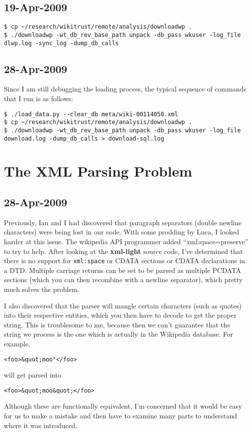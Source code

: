 \subsection{19-Apr-2009}

\begin{verbatim}
$ cp ~/research/wikitrust/remote/analysis/downloadwp .
$ ./downloadwp -wt_db_rev_base_path unpack -db_pass wkuser -log_file dlwp.log -sync_log -dump_db_calls
\end{verbatim}

\subsection{28-Apr-2009}

Since I am still debugging the loading process, the typical sequence
of commands that I run is as follows:
\begin{verbatim}
$ ./load_data.py --clear_db meta/wiki-00114050.xml
$ cp ~/research/wikitrust/remote/analysis/downloadwp .
$ ./downloadwp -wt_db_rev_base_path unpack -db_pass wkuser -log_file download.log -dump_db_calls > download-sql.log
\end{verbatim}

\section{The XML Parsing Problem}

\subsection{28-Apr-2009}

Previously, Ian and I had discovered that paragraph separators
(double newline characters) were being lost in our code.
With some prodding by Luca, I looked harder at this issue.
The wikipedia API programmer added ``xml:space=preserve''
to try to help.
After looking at the \textbf{xml-light} source code, I've
determined that there is no support for \texttt{xml:space}
or CDATA sections or CDATA declarations in a DTD.
Multiple carriage returns can be set to be parsed as multiple
PCDATA sections (which you can then recombine with a newline
separator), which pretty much solves the problem.

I also discovered that the parser will mangle certain characters
(such as quotes) into their respective entities, which you
then have to decode to get the proper string.
This is troublesome to me, because then we can't guarantee
that the string we process is the one which is actually in
the Wikipedia database.  For example,
\begin{verbatim}
<foo>&quot;moo"</foo>
\end{verbatim}
will get parsed into
\begin{verbatim}
<foo>&quot;moo&quot;</foo>
\end{verbatim}
Although these are functionally equivalent, I'm concerned that
it would be easy for us to make a mistake and then have to
examine many parts to understand where it was introduced.

